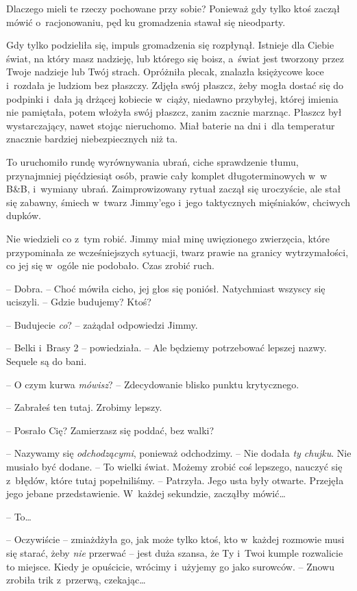 \documentclass[oneside,polish,11pt,sfheadings]{mwbk}
\begin{document}
Dlaczego mieli te rzeczy pochowane przy sobie? Ponieważ gdy tylko ktoś
zaczął mówić o~racjonowaniu, pęd ku gromadzenia stawał się nieodparty.

Gdy tylko podzieliła się, impuls gromadzenia się rozpłynął. Istnieje dla
Ciebie świat, na który masz nadzieję, lub którego się boisz, a~świat
jest tworzony przez Twoje nadzieje lub Twój strach. Opróżniła plecak,
znalazła księżycowe koce i~rozdała je ludziom bez płaszczy. Zdjęła swój
płaszcz, żeby mogła dostać się do podpinki i~dała ją drżącej kobiecie w~ciąży, niedawno przybyłej, której imienia nie pamiętała, potem włożyła
swój płaszcz, zanim zacznie marznąc. Płaszcz był wystarczający, nawet
stojąc nieruchomo. Miał baterie na dni i~dla temperatur znacznie
bardziej niebezpiecznych niż ta.

To uruchomiło rundę wyrównywania ubrań, ciche sprawdzenie tłumu,
przynajmniej pięćdziesiąt osób, prawie cały komplet długoterminowych w~w B\&B, i~wymiany ubrań. Zaimprowizowany rytuał zaczął się uroczyście, ale
stał się zabawny, śmiech w~twarz Jimmy'ego i~jego taktycznych
mięśniaków, chciwych dupków.

Nie wiedzieli co z~tym robić. Jimmy miał minę uwięzionego zwierzęcia,
które przypominała ze wcześniejszych sytuacji, twarz prawie na granicy
wytrzymałości, co jej się w~ogóle nie podobało. Czas zrobić ruch.

-- Dobra. -- Choć mówiła cicho, jej głos się poniósł. Natychmiast wszyscy
się uciszyli. -- Gdzie budujemy? Ktoś?

-- Budujecie \textit{co}? -- zażądał odpowiedzi Jimmy.

-- Belki i~Brasy 2 -- powiedziała. -- Ale będziemy potrzebować lepszej
nazwy. Sequele są do bani.

-- O czym kurwa \textit{mówisz}? -- Zdecydowanie blisko punktu krytycznego.

-- Zabrałeś ten tutaj. Zrobimy lepszy.

-- Posrało Cię? Zamierzasz się poddać, bez walki?

-- Nazywamy się \textit{odchodzącymi}, ponieważ odchodzimy. -- Nie dodała
\textit{ty chujku}. Nie musiało być dodane. -- To wielki świat. Możemy
zrobić coś lepszego, nauczyć się z~błędów, które tutaj popełniliśmy. -- Patrzyła. Jego usta były otwarte. Przejęła jego jebane przedstawienie. W~każdej sekundzie, zacząłby mówić\ldots 

-- To\ldots 

-- Oczywiście -- zmiażdżyła go, jak może tylko ktoś, kto w~każdej rozmowie
musi się starać, żeby \textit{nie} przerwać -- jest duża szansa, że Ty i~Twoi kumple rozwalicie to miejsce. Kiedy je opuścicie, wrócimy i~użyjemy
go jako surowców. -- Znowu zrobiła trik z~przerwą, czekając\ldots 
\end{document}
